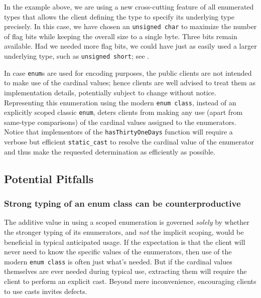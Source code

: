\noindent In the example above, we are using a new cross-cutting
feature of all enumerated types that allows the client defining the
type to specify its underlying type precisely. In this case, we have
chosen an \lstinline!unsigned!~\lstinline!char! to maximize the number of
flag bits while keeping the overall size to a single byte. Three bits
remain available. Had we needed more flag bits, we could have just as
easily used a larger underlying type, such as
  \lstinline!unsigned!~\lstinline!short!; see .

\noindent In case \lstinline!enum!s are used for encoding purposes, the public clients are not intended to make use of the
cardinal values; hence clients are well advised to treat them as
implementation details, potentially subject to change without notice.
Representing this enumeration using the modern
\lstinline!enum!~\lstinline!class!, instead of an explicitly scoped classic
\lstinline!enum!, deters clients from making any use (apart from same-type
comparisons) of the cardinal values assigned to the enumerators. Notice
that implementors of the \lstinline!hasThirtyOneDays! function will require
a verbose but efficient \lstinline!static_cast! to resolve the
cardinal value of the enumerator and thus make the requested
determination as efficiently as possible.

\subsection[Potential Pitfalls]{Potential Pitfalls}\label{potential-pitfalls-enumclass}

\subsubsection[Strong typing of an \lstinline!enum! \lstinline!class! can be counterproductive]{Strong typing of an {\SubsubsecCode enum} {\SubsubsecCode class} can be counterproductive}\label{strong-typing-of-an-enum-class-can-be-counterproductive}

The additive value in using a scoped enumeration is governed \emph{solely} by whether the stronger typing of its enumerators, and \emph{not} the implicit scoping, would be beneficial in typical anticipated usage.
If the expectation is that the client will
never need to know the specific values of the enumerators, then use
of the modern \lstinline!enum!~\lstinline!class! is often just what's needed.
But if the cardinal values themselves are ever needed during typical
use, extracting them will require the client to perform an explicit
cast. Beyond mere inconvenience, encouraging clients to use casts
invites defects.

